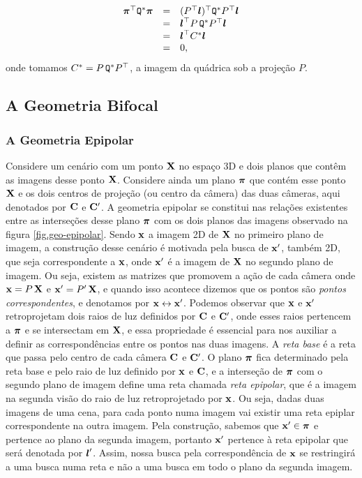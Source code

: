 \begin{equation*}
\begin{array}{rcl}
\boldsymbol{\pi}^\top {\tt Q}^*\boldsymbol{\pi}&=&(P^\top\boldsymbol{l})^\top {\tt Q}^*P^\top\boldsymbol{l}\\
&=&\boldsymbol{l}^\top P\,{\tt Q}^*P^\top\boldsymbol{l}\\
&=&\boldsymbol{l}^\top C^*\boldsymbol{l}\\
&=&0,
\end{array}
\end{equation*}
onde tomamos $C^*=P\,{\tt Q}^*P^\top$, a imagem da quádrica sob a projeção $P$.

\subsection{A Geometria Bifocal}

\subsubsection{A Geometria Epipolar}

Considere um cenário com um ponto $\mathbf{X}$ no espaço 3D e dois planos que contêm as imagens desse ponto $\mathbf{X}$. Considere ainda um plano $\boldsymbol{\pi}$ que contém esse ponto $\mathbf{X}$ e os dois centros de projeção (ou centro da câmera) das duas câmeras, aqui denotados por ${\bf C}$ e ${\bf C}'$. A geometria epipolar se constitui nas relações existentes entre as interseções desse plano $\boldsymbol{\pi}$ com os dois planos das imagens observado na figura \ref{fig.geo-epipolar}. Sendo $\mathbf{x}$ a imagem 2D de $\mathbf{X}$ no primeiro plano de imagem, a construção desse cenário é motivada pela busca de $\mathbf{x}'$, também 2D, que seja correspondente a $\mathbf{x}$, onde $\mathbf{x}'$ é a imagem de $\mathbf{X}$ no segundo plano de imagem. Ou seja, existem as matrizes que promovem a ação de cada câmera onde $\mathbf{x}=P\,\mathbf{X}$ e $\mathbf{x}'=P'\,\mathbf{X}$, e quando isso acontece dizemos que os pontos são {\it pontos correspondentes}, e denotamos por $\mathbf{x}\leftrightarrow\mathbf{x}'$. Podemos observar que $\mathbf{x}$ e $\mathbf{x}'$ retroprojetam dois raios de luz definidos por ${\bf C}$ e ${\bf C}'$, onde esses raios pertencem a $\boldsymbol{\pi}$ e se intersectam em $\mathbf{X}$, e essa propriedade é essencial para nos auxiliar a definir as correspondências entre os pontos nas duas imagens. A \textit{reta base} é a reta que passa pelo centro de cada câmera ${\bf C}$ e ${\bf C}'$. O plano $\boldsymbol{\pi}$ fica determinado pela reta base e pelo raio de luz definido por $\mathbf{x}$ e ${\bf C}$, e a interseção de $\boldsymbol{\pi}$ com o segundo plano de imagem define uma reta chamada \textit{reta epipolar}, que é a imagem na segunda visão do raio de luz retroprojetado por $\mathbf{x}$. Ou seja, dadas duas imagens de uma cena, para cada ponto numa imagem vai existir uma reta epiplar correspondente na outra imagem. Pela construção, sabemos que $\mathbf{x}'\in\boldsymbol{\pi}$ e pertence ao plano da segunda imagem, portanto $\mathbf{x}'$ pertence à reta epipolar que será denotada por $\boldsymbol{l}'$. Assim, nossa busca pela correspondência de $\mathbf{x}$ se restringirá a uma busca numa reta e não a uma busca em todo o plano da segunda imagem. 

